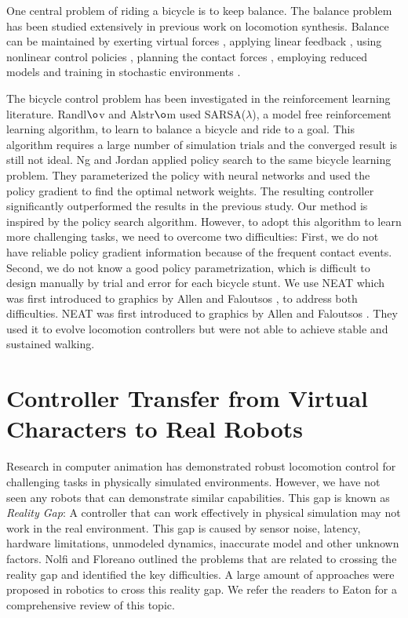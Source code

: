One central problem of riding a bicycle is to keep balance. The balance problem has been studied extensively in previous work on locomotion synthesis. Balance can be maintained by exerting virtual forces \cite{Pratt2001,Coros2010}, applying linear feedback \cite{Laszlo:1996,Yin:2007,daSilva:2008,Coros2010}, using nonlinear control policies \cite{Muico:2009}, planning the contact forces \cite{Muico:2009,Tan:2012}, employing reduced models \cite{Tsai:2010,Kwon:2010,mordatch2010,Coros2010,Ye:2010} and training in stochastic environments \cite{Wang:2010}.

The bicycle control problem has been investigated in the reinforcement learning literature. Randl$\o$v and Alstr$\o$m \cite{RandlovAlstrom:1998} used SARSA($\lambda$), a model free reinforcement learning algorithm, to learn to balance a bicycle and ride to a goal. This algorithm requires a large number of simulation trials and the converged result is still not ideal. Ng and Jordan \cite{Ng:2000:PPS} applied policy search to the same bicycle learning problem. They parameterized the policy with neural networks and used the policy gradient to find the optimal network weights. The resulting controller significantly outperformed the results in the previous study. Our method is inspired by the policy search algorithm. However, to adopt this algorithm to learn more challenging tasks, we need to overcome two difficulties: First, we do not have reliable policy gradient information because of the frequent contact events. Second, we do not know a good policy parametrization, which is difficult to design manually by trial and error for each bicycle stunt. We use NEAT \cite{Stanley:2002:ENN} which was first introduced to graphics by Allen and Faloutsos \cite{Allen2009}, to address both difficulties. NEAT was first introduced to graphics by Allen and Faloutsos \cite{Allen2009}. They used it to evolve locomotion controllers but were not able to achieve stable and sustained walking.

\section{Controller Transfer from Virtual Characters to Real Robots}
Research in computer animation has demonstrated robust locomotion control for challenging tasks in physically simulated environments. However, we have not seen any robots that can demonstrate similar capabilities. This gap is known as \emph{Reality Gap}: A controller that can work effectively in physical simulation may not work in the real environment. This gap is caused by sensor noise, latency, hardware limitations, unmodeled dynamics, inaccurate model and other unknown factors. Nolfi and Floreano \cite{Nolfi:2000} outlined the problems that are related to crossing the reality gap and identified the key difficulties. A large amount of approaches were proposed in robotics to cross this reality gap. We refer the readers to Eaton \cite{Eaton:2015} for a comprehensive review of this topic.

